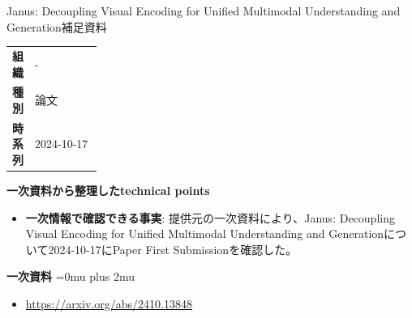 \begin{technicalnote}{Janus: Decoupling Visual Encoding for Unified Multimodal Understanding and Generation}{補足資料}
\begingroup
\begin{tabularx}{\linewidth}{@{}>{\bfseries}p{0.22\linewidth}X@{}}
組織 & - \\
種別 & 論文 \\
時系列 & 2024-10-17 \\
\end{tabularx}
\smallskip
{\bfseries 一次資料から整理したtechnical points}
\begin{itemize}[leftmargin=1.5em,itemsep=0.35em]
\item \textbf{一次情報で確認できる事実}: 提供元の一次資料により、Janus: Decoupling Visual Encoding for Unified Multimodal Understanding and Generationについて2024-10-17にPaper First Submissionを確認した。
\end{itemize}
\begin{minipage}{\linewidth}
\begin{samepage}
{\bfseries 一次資料}
\begingroup\sloppy
\Urlmuskip=0mu plus 2mu\relax
\begin{itemize}[leftmargin=1.5em,itemsep=0.25em]
\item {\scriptsize\url{https://arxiv.org/abs/2410.13848}}
\end{itemize}
\endgroup
\end{samepage}
\end{minipage}
\endgroup
\end{technicalnote}
\medskip

